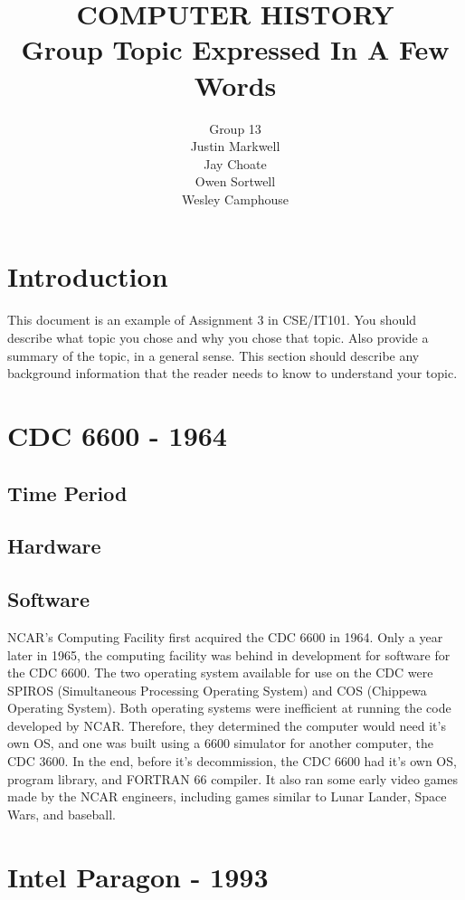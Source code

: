 \documentclass[letterpaper, 10 pt, conference]{IEEEconf}
\title{\LARGE \bf
COMPUTER HISTORY\\
\large Group Topic Expressed In A Few Words
}
\author{Group 13\\
\small Justin Markwell\\
\small Jay Choate\\
\small Owen Sortwell\\
\small Wesley Camphouse\\
}
\begin{document}
\maketitle
\thispagestyle{empty}
\pagestyle{empty}


\section{Introduction}

This document is an example of Assignment 3 in CSE/IT101.
You should describe what topic you chose and
why you chose that topic. Also provide a summary of the
topic, in a general sense. This section should describe any
background information that the reader needs to know to
understand your topic.

\section{CDC 6600 - 1964}
\subsection{Time Period}
\subsection{Hardware}
\subsection{Software}
NCAR's Computing Facility first acquired the CDC 6600 in 1964. 
Only a year later in 1965, the computing facility was behind in 
development for software for the CDC 6600. The two operating 
system available for use on the CDC were SPIROS (Simultaneous
Processing Operating System) and COS (Chippewa Operating System). 
Both operating systems were inefficient at running the code 
developed by NCAR. Therefore, they determined the computer would 
need it's own OS, and one was built using a 6600 simulator for 
another computer, the CDC 3600. In the end, before it's 
decommission, the CDC 6600 had it's own OS, program library, and 
FORTRAN 66 compiler. It also ran some early video games made by 
the NCAR engineers, including games similar to Lunar Lander, Space
Wars, and baseball.
\section{Intel Paragon - 1993}
\end{document}
